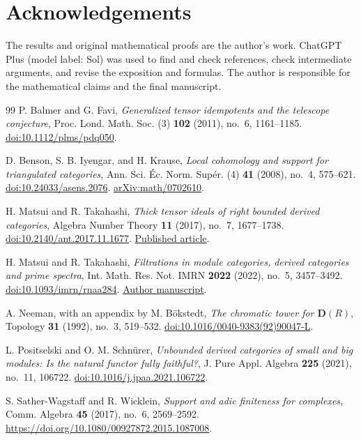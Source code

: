 \documentclass[11pt]{amsart}
\numberwithin{equation}{section}
\theoremstyle{definition}
\theoremstyle{remark}
\newcommand{\D}{\mathbf D}
\begin{document}
\section*{Acknowledgements}
The results and original mathematical proofs are the author's work.
ChatGPT Plus (model label: Sol) was used to find and check references,
check intermediate arguments, and revise the exposition and formulas.
The author is responsible for the mathematical claims and the final
manuscript.

\begin{thebibliography}{99}
P. Balmer and G. Favi,
\emph{Generalized tensor idempotents and the telescope conjecture},
Proc. Lond. Math. Soc. (3) \textbf{102} (2011), no.~6, 1161--1185.
\href{https://doi.org/10.1112/plms/pdq050}{doi:10.1112/plms/pdq050}.

D. Benson, S. B. Iyengar, and H. Krause,
\emph{Local cohomology and support for triangulated categories},
Ann. Sci. \'Ec. Norm. Sup\'er. (4) \textbf{41} (2008), no.~4, 575--621.
\href{https://doi.org/10.24033/asens.2076}{doi:10.24033/asens.2076}.
\href{https://arxiv.org/abs/math/0702610}{arXiv:math/0702610}.

H. Matsui and R. Takahashi,
\emph{Thick tensor ideals of right bounded derived categories},
Algebra Number Theory \textbf{11} (2017), no.~7, 1677--1738.
\href{https://doi.org/10.2140/ant.2017.11.1677}{doi:10.2140/ant.2017.11.1677}.
\href{https://msp.org/ant/2017/11-7/ant-v11-n7-p07-s.pdf}{Published article}.

H. Matsui and R. Takahashi,
\emph{Filtrations in module categories, derived categories and prime spectra},
Int. Math. Res. Not. IMRN \textbf{2022} (2022), no.~5, 3457--3492.
\href{https://doi.org/10.1093/imrn/rnaa284}{doi:10.1093/imrn/rnaa284}.
\href{https://mthiroki.github.io/papers/ncoh27.pdf}{Author manuscript}.

A. Neeman, with an appendix by M. B\"okstedt,
\emph{The chromatic tower for $\D(R)$},
Topology \textbf{31} (1992), no.~3, 519--532.
\href{https://doi.org/10.1016/0040-9383(92)90047-L}{doi:10.1016/0040-9383(92)90047-L}.

L. Positselski and O. M. Schn\"urer,
\emph{Unbounded derived categories of small and big modules:
Is the natural functor fully faithful?},
J. Pure Appl. Algebra \textbf{225} (2021), no.~11, 106722.
\href{https://doi.org/10.1016/j.jpaa.2021.106722}{doi:10.1016/j.jpaa.2021.106722}.

S. Sather-Wagstaff and R. Wicklein,
\emph{Support and adic finiteness for complexes},
Comm. Algebra \textbf{45} (2017), no.~6, 2569--2592.
\url{https://doi.org/10.1080/00927872.2015.1087008}.


\end{thebibliography}
\end{document}
